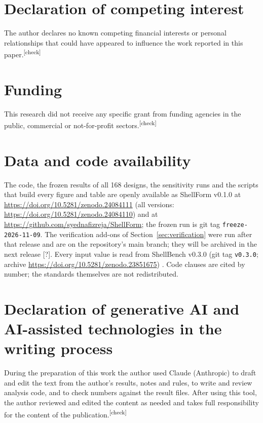 \documentclass[preprint,12pt]{elsarticle}
\newcommand{\chk}{\textsuperscript{\textcolor{markcol}{\sffamily\scriptsize[check]}}}
\newcommand{\unk}{\textcolor{markcol}{\sffamily\small[?]}}
\newcommand{\chk}{}
\newcommand{\unk}{}
\begin{document}
\section*{Declaration of competing interest}

The author declares no known competing financial interests or personal relationships that could have appeared to influence the work reported in this paper.\chk

\section*{Funding}

This research did not receive any specific grant from funding agencies in the public, commercial or not-for-profit sectors.\chk

\section*{Data and code availability}

The code, the frozen results of all 168 designs, the sensitivity runs and the scripts that build every figure and table are openly available as ShellForm v0.1.0 at \url{https://doi.org/10.5281/zenodo.24084111} (all versions: \url{https://doi.org/10.5281/zenodo.24084110}) and at \url{https://github.com/syednafizreja/ShellForm}; the frozen run is git tag \texttt{freeze-2026-11-09}. The verification add-ons of Section~\ref{sec:verification} were run after that release and are on the repository's main branch; they will be archived in the next release \unk. Every input value is read from ShellBench v0.3.0 (git tag \texttt{v0.3.0}; archive \url{https://doi.org/10.5281/zenodo.23851675}) \cite{ShellBench}. Code clauses are cited by number; the standards themselves are not redistributed.

\section*{Declaration of generative AI and AI-assisted technologies in the writing process}

During the preparation of this work the author used Claude (Anthropic) to draft and edit the text from the author's results, notes and rules, to write and review analysis code, and to check numbers against the result files. After using this tool, the author reviewed and edited the content as needed and takes full responsibility for the content of the publication.\chk



\end{document}
